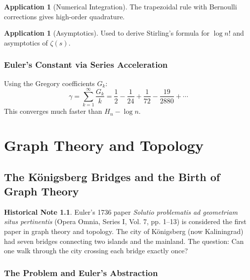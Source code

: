 \documentclass[11pt,a4paper,twoside]{book}
\theoremstyle{eulerstyle}
\theoremstyle{definition}
\newtheorem{historical}[theorem]{Historical Note}
\newtheorem{application}[theorem]{Application}
\begin{document}
\begin{application}[Numerical Integration]
The trapezoidal rule with Bernoulli corrections gives high-order quadrature.
\end{application}

\begin{application}[Asymptotics]
Used to derive Stirling's formula for $\log n!$ and asymptotics of $\zeta(s)$.
\end{application}

\section{Euler's Constant via Series Acceleration}

Using the Gregory coefficients $G_k$:
\[
\gamma = \sum_{k=1}^\infty \frac{G_k}{k} = \frac{1}{2} - \frac{1}{24} + \frac{1}{72} - \frac{19}{2880} + \cdots
\]
This converges much faster than $H_n - \log n$.

\cleardoublepage

\part{Graph Theory and Topology}
\label{part:graph_topology}

\chapter{The Königsberg Bridges and the Birth of Graph Theory}
\label{ch:konigsberg}

\begin{historical}
Euler's 1736 paper \emph{Solutio problematis ad geometriam situs pertinentis} (Opera Omnia, Series I, Vol. 7, pp. 1--13) is considered the first paper in graph theory and topology. The city of Königsberg (now Kaliningrad) had seven bridges connecting two islands and the mainland. The question: Can one walk through the city crossing each bridge exactly once? \cite{euler1736}\end{historical}

\section{The Problem and Euler's Abstraction}
\end{document}
